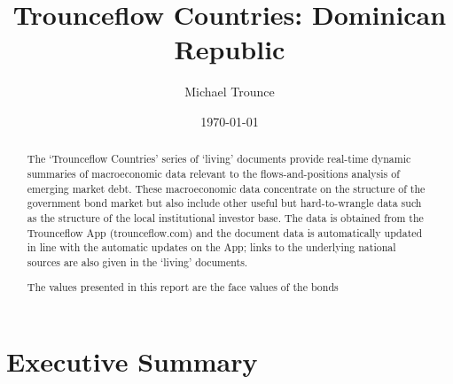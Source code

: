 \documentclass[11pt, notitlepage]{report}%
\title{Trounceflow Countries: Dominican Republic}%
\author{Michael Trounce}%
\date{\today}%
\begin{document}
%
\normalsize%
\maketitle%
\begin{abstract}%
The `Trounceflow Countries' series of `living' documents provide real{-}time dynamic summaries of macroeconomic data relevant to the flows{-}and{-}positions analysis of emerging market debt. These macroeconomic data concentrate on the structure of the government bond market but also include other useful but hard{-}to{-}wrangle data such as the structure of the local institutional investor base. The data is obtained from the Trounceflow App (trounceflow.com) and the document data is automatically updated in line with the automatic updates on the App; links to the underlying national sources are also given in the `living' documents.%
\begin{Large}%
\newline%
\newline%
\newline%
\newline%
\newline%
\newline%
\newline%
\newline%
\newline%
\newline%
\newline%
\newline%
\newline%
\newline%
\newline%
The values presented in this report are the face values of the bonds%
\end{Large}%
\end{abstract}%
\newpage%
\tableofcontents%
\newpage%
\chapter{Executive Summary}%
\newpage%
\end{document}
